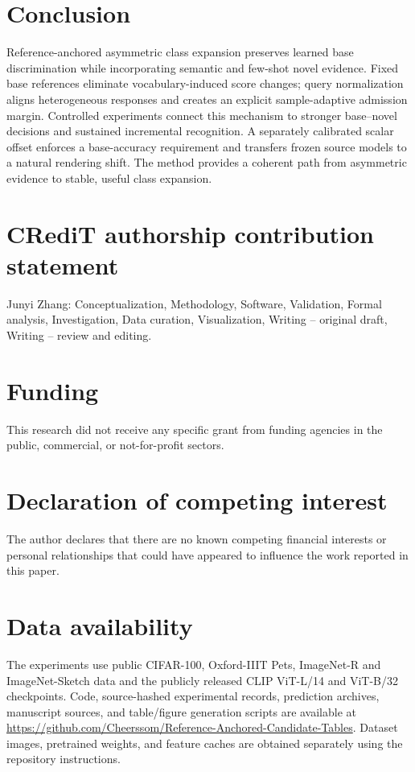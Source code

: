 \documentclass[preprint,review,12pt]{elsarticle}
\begin{document}
\section{Conclusion}
Reference-anchored asymmetric class expansion preserves learned base discrimination while incorporating semantic and few-shot novel evidence. Fixed base references eliminate vocabulary-induced score changes; query normalization aligns heterogeneous responses and creates an explicit sample-adaptive admission margin. Controlled experiments connect this mechanism to stronger base--novel decisions and sustained incremental recognition. A separately calibrated scalar offset enforces a base-accuracy requirement and transfers frozen source models to a natural rendering shift. The method provides a coherent path from asymmetric evidence to stable, useful class expansion.

\section*{CRediT authorship contribution statement}
Junyi Zhang: Conceptualization, Methodology, Software, Validation, Formal analysis, Investigation, Data curation, Visualization, Writing -- original draft, Writing -- review and editing.

\section*{Funding}
This research did not receive any specific grant from funding agencies in the public, commercial, or not-for-profit sectors.

\section*{Declaration of competing interest}
The author declares that there are no known competing financial interests or personal relationships that could have appeared to influence the work reported in this paper.

\section*{Data availability}
The experiments use public CIFAR-100, Oxford-IIIT Pets, ImageNet-R and ImageNet-Sketch data and the publicly released CLIP ViT-L/14 and ViT-B/32 checkpoints. Code, source-hashed experimental records, prediction archives, manuscript sources, and table/figure generation scripts are available at \url{https://github.com/Cheerssom/Reference-Anchored-Candidate-Tables}. Dataset images, pretrained weights, and feature caches are obtained separately using the repository instructions.
\end{document}

